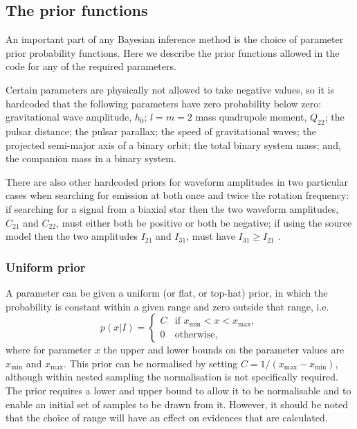 \subsection{The prior functions}\label{sec:priorfuncs}

An important part of any Bayesian inference method is the choice of parameter prior probability functions. Here we describe the prior
functions allowed in the code for any of the required parameters.

Certain parameters are physically not allowed to take negative values, so it is hardcoded that the following parameters
have zero probability below zero: gravitational wave amplitude, $h_0$; $l=m=2$ mass quadrupole moment, $Q_{22}$; the pulsar
distance; the pulsar parallax; the speed of gravitational waves; the projected semi-major axis of a binary orbit; the total
binary system mass; and, the companion mass in a binary system.

There are also other hardcoded priors for waveform amplitudes in two particular cases when searching for emission at both once
and twice the rotation frequency: if searching for a signal from a biaxial star then the two waveform amplitudes, $C_{21}$ and $C_{22}$,
must either both be positive or both be negative; if using the source model then the two amplitudes $I_{21}$ and $I_{31}$, must
have $I_{31} \geqslant I_{21}$ \citep[see, e.g.,][]{2015MNRAS.453.4399P}.

\subsubsection{Uniform prior}\label{sec:uniformprior}

A parameter can be given a uniform (or flat, or top-hat) prior, in which the probability is constant within a given
range and zero outside that range, i.e.
\begin{equation}
p(x|I) = \begin{cases}
             C & \text{if } x_{\text{min}} < x < x_{\text{max}}, \\
             0 & \text{otherwise},
            \end{cases}
\end{equation}
where for parameter $x$ the upper and lower bounds on the parameter values are $x_{\text{min}}$ and $x_{\text{max}}$. This
prior can be normalised by setting $C = 1/(x_{\text{max}}-x_{\text{min}})$, although within nested sampling the normalisation
is not specifically required. The prior requires a lower and upper bound to allow it to be normalisable and to enable
an initial set of samples to be drawn from it. However, it should be noted that the choice of range will have an
effect on evidences that are calculated.

